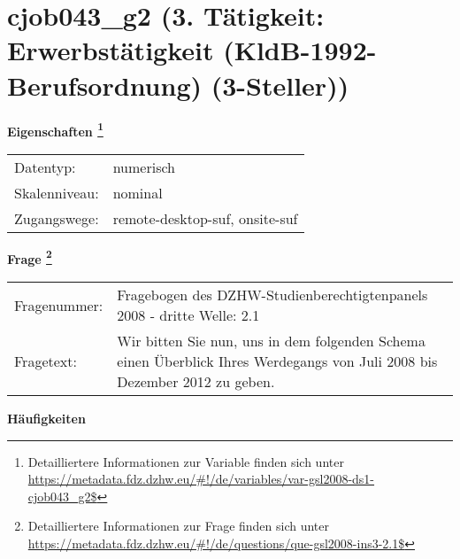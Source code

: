 
    \setcounter{footnote}{0}

    \vspace*{-1.8cm}
	\section{cjob043\_g2 (3. Tätigkeit: Erwerbstätigkeit (KldB-1992-Berufsordnung) (3-Steller))}
	\label{section:cjob043_g2}



    \vspace*{0.5cm}
    \noindent\textbf{Eigenschaften
	\footnote{Detailliertere Informationen zur Variable finden sich unter
		\url{https://metadata.fdz.dzhw.eu/\#!/de/variables/var-gsl2008-ds1-cjob043_g2$}}}\\
	\begin{tabularx}{\hsize}{@{}lX}
	Datentyp: & numerisch \\
	Skalenniveau: & nominal \\
	Zugangswege: &
	  remote-desktop-suf, 
	  onsite-suf
 \\
    \end{tabularx}



				\vspace*{0.5cm}
                \noindent\textbf{Frage
	                \footnote{Detailliertere Informationen zur Frage finden sich unter
		              \url{https://metadata.fdz.dzhw.eu/\#!/de/questions/que-gsl2008-ins3-2.1$}}}\\
				\begin{tabularx}{\hsize}{@{}lX}
					Fragenummer: &
					  Fragebogen des DZHW-Studienberechtigtenpanels 2008 - dritte Welle:
					  2.1
 \\
					Fragetext: & Wir bitten Sie nun, uns in dem folgenden Schema einen Überblick Ihres Werdegangs von Juli 2008 bis Dezember 2012 zu geben. \\
				\end{tabularx}





        		\vspace*{0.5cm}
                \noindent\textbf{Häufigkeiten}

